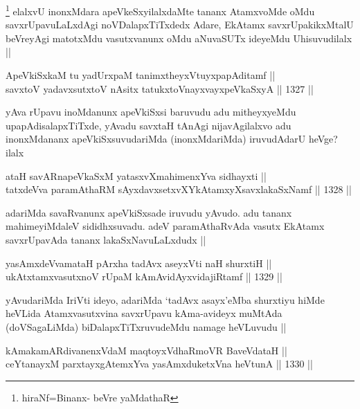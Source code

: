 \begin{artha}
\footnote{hiraNf=Binanx- beVre yaMdathaR}
elalxvU inonxMdara apeVkeSxyilalxdaMte tananx AtamxvoMde oMdu savxrUpavuLaLxdAgi noVDalapxTiTxdedx Adare, EkAtamx savxrUpakikxMtalU beVreyAgi matotxMdu vasutxvanunx oMdu aNuvaSUTx ideyeMdu Uhisuvudilalx ||
\end{artha}


\begin{shl}
ApeVkiSxkaM tu yadUrxpaM tanimxtheyxVtuyxpapAditamf ||  \\
savxtoV yadavxsutxtoV nAsitx tatukxtoV\s nayxvayxpeVkaSxyA ||  1327 ||  
\end{shl}

\begin{artha}
yAva rUpavu inoMdanunx apeVkiSxsi baruvudu adu mitheyxyeMdu upapAdisalapxTiTxde, yAvadu savxtaH tAnAgi nijavAgilalxvo adu inonxMdananx apeVkiSxsuvudariMda (inonxMdariMda) iruvudAdarU heVge? ilalx
\end{artha}

\begin{shl}
ataH savARnapeVkaSxM yatasxvXmahimenxYva sidhayxti || \\
tatxdeVva paramAthaRM sAyxdavxsetxvXYkAtamxyXsavxlakaSxNamf ||  1328 ||  
\end{shl}

\begin{artha}
adariMda savaRvanunx apeVkiSxsade iruvudu yAvudo. adu tananx mahimeyiMdaleV sididhxsuvadu. adeV paramAthaRvAda vasutx EkAtamx savxrUpavAda tananx lakaSxNavuLaLxdudx ||
\end{artha}

\begin{shl}
yasAmxdeVvamataH pArxha tadAvx aseyxVti naH shurxtiH || \\
ukAtxtamxvasutxnoV rUpaM kAmAvidAyxvidajiRtamf ||  1329 ||  
\end{shl}

\begin{artha}
yAvudariMda IriVti ideyo, adariMda `tadAvx asayx'eMba shurxtiyu hiMde heVLida Atamxvasutxvina savxrUpavu kAma-avideyx muMtAda (doVSagaLiMda) biDalapxTiTxruvudeMdu namage heVLuvudu ||
\end{artha}


\begin{shl}
kAmakamARdivanenxVdaM maqtoyxVdhaRmoVR BaveVdataH || \\
ceYtanayxM parxtayxgAtemxYva yasAmxduketxVna heVtunA ||  1330 ||  
\end{shl}

